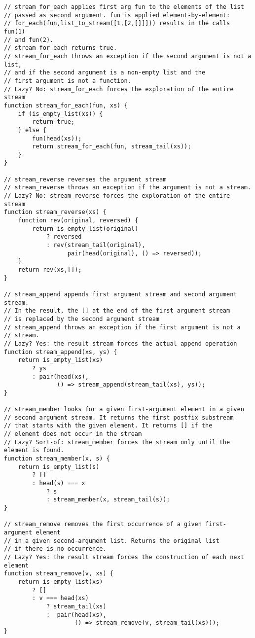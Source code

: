 \begin{lstlisting}
// stream_for_each applies first arg fun to the elements of the list
// passed as second argument. fun is applied element-by-element:
// for_each(fun,list_to_stream([1,[2,[]]])) results in the calls fun(1)
// and fun(2).
// stream_for_each returns true.
// stream_for_each throws an exception if the second argument is not a list,
// and if the second argument is a non-empty list and the
// first argument is not a function.
// Lazy? No: stream_for_each forces the exploration of the entire stream
function stream_for_each(fun, xs) {
    if (is_empty_list(xs)) {
        return true;
    } else {
        fun(head(xs));
        return stream_for_each(fun, stream_tail(xs));
    }
}

// stream_reverse reverses the argument stream
// stream_reverse throws an exception if the argument is not a stream.
// Lazy? No: stream_reverse forces the exploration of the entire stream
function stream_reverse(xs) {
    function rev(original, reversed) {
        return is_empty_list(original)
            ? reversed
            : rev(stream_tail(original), 
                  pair(head(original), () => reversed));
    }
    return rev(xs,[]);
}

// stream_append appends first argument stream and second argument stream.
// In the result, the [] at the end of the first argument stream
// is replaced by the second argument stream
// stream_append throws an exception if the first argument is not a
// stream.
// Lazy? Yes: the result stream forces the actual append operation
function stream_append(xs, ys) {
    return is_empty_list(xs)
        ? ys
        : pair(head(xs),
               () => stream_append(stream_tail(xs), ys)); 
}

// stream_member looks for a given first-argument element in a given
// second argument stream. It returns the first postfix substream
// that starts with the given element. It returns [] if the
// element does not occur in the stream
// Lazy? Sort-of: stream_member forces the stream only until the element is found.
function stream_member(x, s) {
    return is_empty_list(s)
        ? []
        : head(s) === x
            ? s
            : stream_member(x, stream_tail(s));
}

// stream_remove removes the first occurrence of a given first-argument element
// in a given second-argument list. Returns the original list
// if there is no occurrence.
// Lazy? Yes: the result stream forces the construction of each next element
function stream_remove(v, xs) {
    return is_empty_list(xs)
        ? []
        : v === head(xs)
            ? stream_tail(xs)
            :  pair(head(xs), 
                    () => stream_remove(v, stream_tail(xs))); 
}


\end{lstlisting}
